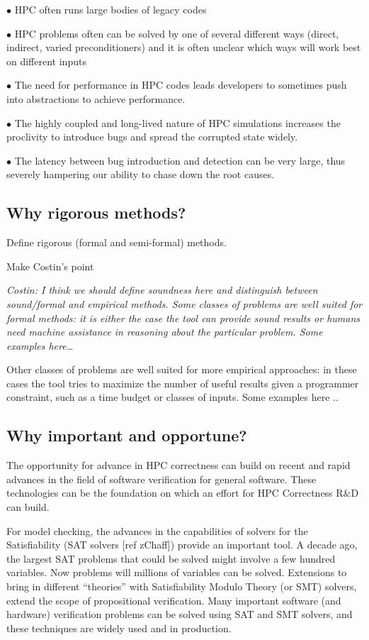 $\bullet$ HPC often runs large bodies of legacy codes

$\bullet$ HPC problems often can be solved by one of several different ways (direct, indirect, varied preconditioners) and it is often unclear which ways will work best on different inputs
 
$\bullet$ The need for performance in HPC codes leads developers to sometimes push into abstractions to achieve performance.

$\bullet$ The highly coupled and long-lived nature of HPC simulations increases the proclivity to introduce bugs and spread the corrupted state widely. 

$\bullet$ The latency between bug introduction and detection can be very large, thus severely hampering our ability to chase down the root causes.


   
\subsection{Why rigorous methods?}

Define rigorous (formal and 
semi-formal) methods.

Make Costin's point 
{\small\em Costin: I think we should define soundness here and distinguish between sound/formal  and empirical methods.
Some classes of problems are well suited for formal methods: it is either the case the tool can provide sound results or humans need machine assistance in reasoning about the particular problem. Some examples here…

Other classes of problems are well suited for more empirical approaches: in these cases the tool tries to maximize the number of useful results given a programmer constraint, such as a time budget  or classes of inputs. Some examples here ..
}

\subsection{Why important and opportune?}

The opportunity for advance in HPC correctness can build on recent and rapid advances in the field of software verification for general software.   These technologies can be the foundation on which an effort for HPC Correctness R\&D can build.

For model checking, the advances in the capabilities of solvers for the Satisfiability (SAT solvers [ref zChaff]) provide an important tool.  A decade ago, the largest SAT problems that could be solved might involve a few hundred variables.  Now problems will millions of variables can be solved.  Extensions to bring in different “theories” with Satisfiability Modulo Theory (or SMT) solvers, extend the scope of propositional verification.  Many important software (and hardware) verification problems can be solved using SAT and SMT solvers, and these techniques are widely used and in production.

